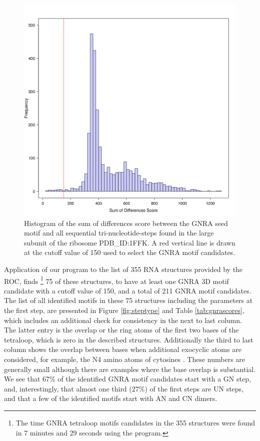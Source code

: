 \begin{figure}
\centering 
\includegraphics[angle=0, scale=0.5]{Chapter5/gnrahisto.png}
\caption{Histogram of  the sum of  differences score between  the GNRA
  seed  motif and  all  sequential tri-nucleotide-steps  found in  the
  large subunit of  the ribosome PDB\_ID:1FFK. A red  vertical line is
  drawn  at the  cutoff value  of 150  used to  select the  GNRA motif
  candidates.}
\label{fig:gnrahist}
\end{figure}

Application of our program to  the list of 355 RNA structures provided
by the ROC, finds  \footnote{The time GNRA tetraloop motifs candidates
  in the 355  structures were found in 7 minutes  and 29 seconds using
  the program.}  75 of these structures,  to have at least one GNRA 3D
motif candidate  with a cutoff value of  150, and a total  of 211 GNRA
motif  candidates.  The  list of  all  identified motifs  in these  75
structures including  the parameters at the first  step, are presented
in  Figure \ref{fig:steptype}  and  Table \ref{tab:gnrascores},  which
includes  an additional  check for  consistency  in the  next to  last
column.  The  latter entry  is the  overlap or the  ring atoms  of the
first  two bases  of the  tetraloop, which  is zero  in  the described
structures.  Additionally  the third to last column  shows the overlap
between  bases when  additional  exocyclic atoms  are considered,  for
example, the N4 amino atoms of cytosines \cite{lu2003}.  These numbers
are generally small although there are examples where the base overlap
is  substantial.  We  see  that  67\% of  the  identified  GNRA  motif
candidates start with  a GN step, and, interestingly,  that almost one
third (27\%) of  the first steps are  UN steps, and that a  few of the
identified motifs start with AN and CN dimers.

